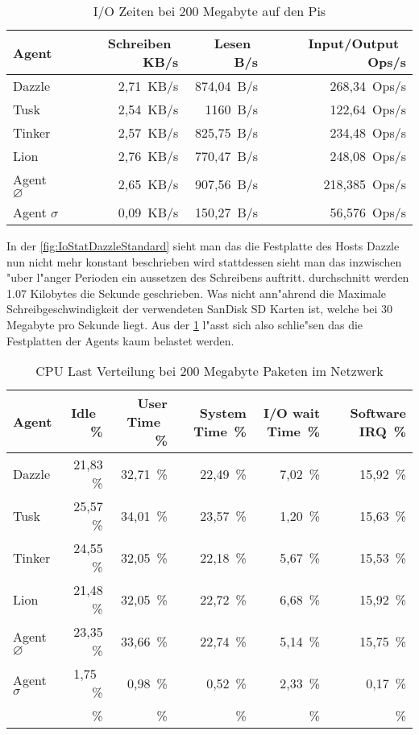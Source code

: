 \begin{table}
\centering
\begin{tabular}{l%
 r<{\,KB/s}%
 r<{\,B/s}%
 r<{\,Ops/s}%
}
Agent	  			& Schreiben	 	& Lesen			& Input/Output 		\\	
\hline
Dazzle 				& 2,71			& 874,04		& 268,34	        \\
Tusk 				& 2,54			& 1160			& 122,64			\\
Tinker				& 2,57 			& 825,75		& 234,48		 	\\
Lion				& 2,76			& 770,47		& 248,08	 	\\
Agent $\diameter $  		& 2,65			& 907,56		& 218,385		\\   
Agent $\sigma $ 		& 0,09  		& 150,27		& 56,576		\\
\end{tabular}
\caption{I/O Zeiten bei 200 Megabyte auf den Pis}
\label{tab:NormalbetriebIoStat200Mb}
\end{table}


In der \cref{fig:IoStatDazzleStandard} sieht man das die Festplatte des Hosts Dazzle nun nicht %
mehr konstant beschrieben wird stattdessen sieht man das inzwischen "uber l"anger Perioden %
ein aussetzen des Schreibens auftritt. durchschnitt werden 1.07 Kilobytes die Sekunde geschrieben.  %
Was nicht ann"ahrend die Maximale Schreibgeschwindigkeit der verwendeten %
SanDisk SD Karten ist, welche bei 30 Megabyte pro Sekunde \autocite{san:sd} liegt. %
Aus der \cref{tab:NormalbetriebIoStat200Mb} l"asst sich also schlie"sen das die Festplatten der Agents kaum belastet werden. %

\begin{table}
\centering
\begin{tabular}{l%
 r<{\,\%}%
 r<{\,\%}%
 r<{\,\%}%
 r<{\,\%}%
 r<{\,\%}%
}
Agent  				& Idle			& User Time		& System Time		& I/O wait Time	& Software IRQ	\\
\hline
Dazzle 				& 21,83			& 32,71			& 22,49 		& 7,02		& 15,92	\\
Tusk 				& 25,57			& 34,01			& 23,57			& 1,20		& 15,63	\\
Tinker				& 24,55			& 32,05			& 22,18			& 5,67		& 15,53	\\
Lion				& 21,48			& 32,05			& 22,72			& 6,68		& 15,92	\\ 
Agent $\diameter $  		& 23,35			& 33,66			& 22,74			& 5,14	 	& 15,75	\\   
Agent $\sigma $			&  1,75			&  0,98			&  0,52			& 2,33		& 0,17  \\ 

&\end{tabular}
\caption{CPU Last Verteilung bei 200 Megabyte Paketen im Netzwerk}
\label{tab:CPUlastverteilung200Mb}
\end{table}


